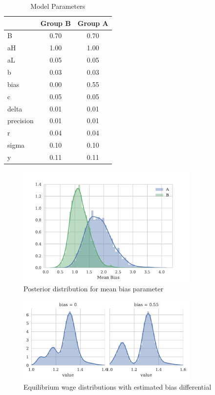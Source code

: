 \documentclass[a4paper,12pt]{article}
\begin{document}
\begin{appendices}
\begin{table}
  \caption{Model Parameters}
  \label{table:model-params}
  \begin{center}
    \begin{tabular}{lcc}
      \hline
      & Group B & Group A  \\
      \hline
      \hline
      B         &    0.70 &    0.70  \\
      aH        &    1.00 &    1.00  \\
      aL        &    0.05 &    0.05  \\
      b         &    0.03 &    0.03  \\
      bias      &    0.00 &    0.55  \\
      c         &    0.05 &    0.05  \\
      delta     &    0.01 &    0.01  \\
      precision &    0.01 &    0.01  \\
      r         &    0.04 &    0.04  \\
      sigma     &    0.10 &    0.10  \\
      y         &    0.11 &    0.11  \\
      \hline
    \end{tabular}
  \end{center}
\end{table}

\begin{figure}[h]
    \centering
    \includegraphics[width=0.8\textwidth]{../experiments/mean-bias}
    \caption{Posterior distribution for mean bias parameter}
    \label{fig:posterior-mean-bias}
\end{figure}

\begin{figure}[h]
    \centering
    \includegraphics[width=0.8\textwidth]{../equilibrium/wage-distributions}
    \caption{Equilibrium wage distributions with estimated bias differential}
    \label{fig:wage-distributions}
\end{figure}

\newpage

\end{appendices}
\end{document}
